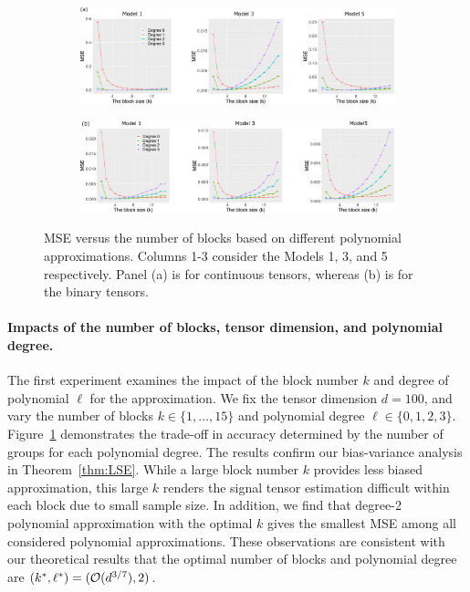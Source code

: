 \documentclass[11pt]{article}
\theoremstyle{definition}
\begin{document}
 \begin{figure}[t!]
    \centering
    \begin{subfigure}[b]{.9\textwidth}
    \includegraphics[width = \textwidth]{figure/deg_conti.pdf}    
    \end{subfigure}
    \vspace{.5cm}
    \begin{subfigure}[b]{.9\textwidth}
    \includegraphics[width = \textwidth]{figure/deg_binary.pdf}    
    \end{subfigure}
    \caption{MSE versus the number of blocks based on different polynomial approximations. Columns 1-3 consider the Models 1, 3, and 5 respectively. Panel (a) is for continuous tensors, whereas (b) is for the binary tensors.}
    \label{fig:degk}
\end{figure}


\paragraph{Impacts of the number of blocks, tensor dimension, and polynomial degree.}
The first experiment examines the impact of the block number $k$ and degree of polynomial $\ell$ for the approximation. We fix the tensor dimension $d = 100$, and vary the number of blocks $k\in\{1,\ldots,15\}$ and polynomial degree $\ell\in\{0,1,2,3\}.$
Figure~\ref{fig:degk} demonstrates the trade-off in accuracy determined by the number of groups for each polynomial degree. The results confirm our bias-variance analysis in Theorem~\ref{thm:LSE}. While a large block number $k$ provides less biased approximation, this large $k$ renders the signal tensor estimation difficult within each block due to small sample size. In addition, we find that degree-2 polynomial approximation with the optimal $k$ gives the smallest MSE among all considered polynomial approximations. These observations are consistent with our theoretical results that the optimal number of blocks and polynomial degree are $(k^*,\ell^*)=(\mathcal{O}(d^{3/7}),2)$. 
\end{document}
